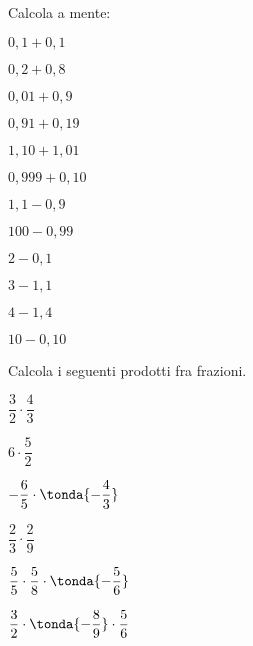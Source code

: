 
\begin{esercizio}
 \label{ese:3.47}
Calcola a mente:

\begin{htmulticols}{4}
\begin{enumeratees}
\item \(0,1+0,1\)
\item \(0,2+0,8\)
\item \(0,01+0,9\)
\item \(0,91+0,19\)
\item \(1,10+1,01\)
\item \(0,999+0,10\)
\item \(1,1-0,9\)
\item \(100-0,99\)
\item \(2-0,1\)
\item \(3-1,1\)
\item \(4-1,4\)
\item \(10-0,10\)
\end{enumeratees}
\end{htmulticols}
\end{esercizio}


\begin{esercizio}
 \label{ese:3.48}
Calcola i seguenti prodotti fra frazioni.

\begin{htmulticols}{3}
\begin{enumeratees}
\spazielenx
 \item \(\dfrac{3}{2}\cdot\dfrac{4}{3}\)
 \item \(6\cdot\dfrac{5}{2}\)
 \item \(-\dfrac{6}{5}\cdot\tonda{-\dfrac{4}{3}}\)
 \item \(\dfrac{2}{3}\cdot\dfrac{2}{9}\)
 \item \(\dfrac{5}{5}\cdot\dfrac{5}{8}\cdot\tonda{-\dfrac{5}{6}}\)
 \item \(\dfrac{3}{2}\cdot\tonda{-\dfrac{8}{9}}\cdot\dfrac{5}{6}\)
\end{enumeratees}
\end{htmulticols}
\end{esercizio}

